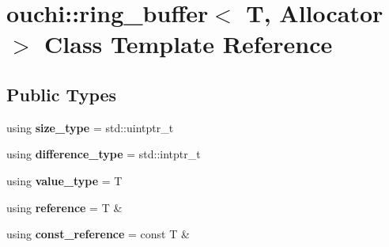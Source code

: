 \hypertarget{classouchi_1_1ring__buffer}{}\section{ouchi\+::ring\+\_\+buffer$<$ T, Allocator $>$ Class Template Reference}
\label{classouchi_1_1ring__buffer}
\subsection*{Public Types}
\begin{DoxyCompactItemize}
\item 
\mbox{\label{classouchi_1_1ring__buffer_aabbf77c2ed9e6f5c7eb352b24636efb6}} 
using {\bfseries size\+\_\+type} = std\+::uintptr\+\_\+t
\item 
\mbox{\label{classouchi_1_1ring__buffer_ac86dc98f1f87adf73292318effea7c97}} 
using {\bfseries difference\+\_\+type} = std\+::intptr\+\_\+t
\item 
\mbox{\label{classouchi_1_1ring__buffer_ad01bccae8169a7c0c05c7d6f02fd8dae}} 
using {\bfseries value\+\_\+type} = T
\item 
\mbox{\label{classouchi_1_1ring__buffer_ada8456a1451c9d1c040e3bf59e662794}} 
using {\bfseries reference} = T \&
\item 
\mbox{\label{classouchi_1_1ring__buffer_a9d2137d71605af95cd5226a44311a348}} 
using {\bfseries const\+\_\+reference} = const T \&
\end{DoxyCompactItemize}
